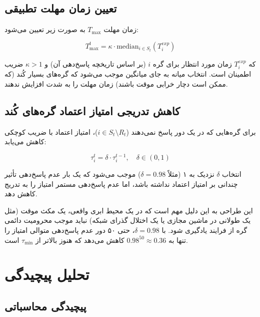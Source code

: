 \subsection{تعیین زمان مهلت تطبیقی}

زمان مهلت $T_{\max}$ به صورت زیر تعیین می‌شود:

\begin{equation}
    T_{\max}^t = \kappa \cdot \text{median}_{i \in S_t}(T_i^{exp})
    \label{eq:timeout}
\end{equation}

که $T_i^{exp}$ زمان مورد انتظار برای گره $i$ (بر اساس تاریخچه پاسخ‌دهی آن) و $\kappa > 1$ ضریب اطمینان است. انتخاب میانه به جای میانگین موجب می‌شود که گره‌های بسیار کُند (که ممکن است دچار خرابی موقت باشند) زمان مهلت را به شدت افزایش ندهند.

\subsection{کاهش تدریجی امتیاز اعتماد گره‌های کُند}

برای گره‌هایی که در یک دور پاسخ نمی‌دهند ($i \in S_t \setminus R_t$)، امتیاز اعتماد با ضریب کوچکی کاهش می‌یابد:

\begin{equation}
    \tau_i^t = \delta \cdot \tau_i^{t-1}, \quad \delta \in (0, 1)
    \label{eq:straggler_decay}
\end{equation}

انتخاب $\delta$ نزدیک به ۱ (مثلاً $\delta = 0.98$) موجب می‌شود که یک بار عدم پاسخ‌دهی تأثیر چندانی بر امتیاز اعتماد نداشته باشد، اما عدم پاسخ‌دهی مستمر امتیاز را به تدریج کاهش دهد.

\begin{info}
    این طراحی به این دلیل مهم است که در یک محیط ابری واقعی، یک مکث موقت (مثل یک  طولانی در ماشین مجازی یا یک اختلال گذرای شبکه) نباید موجب محرومیت دائمی گره از فرایند یادگیری شود. با $\delta = 0.98$، حتی ۵۰ دور عدم پاسخ‌دهی متوالی امتیاز را تنها به $0.98^{50} \approx 0.36$ کاهش می‌دهد که هنوز بالاتر از $\tau_{\min}$ است.
\end{info}


\section{تحلیل پیچیدگی}
\label{sec:complexity}

\subsection{پیچیدگی محاسباتی}

